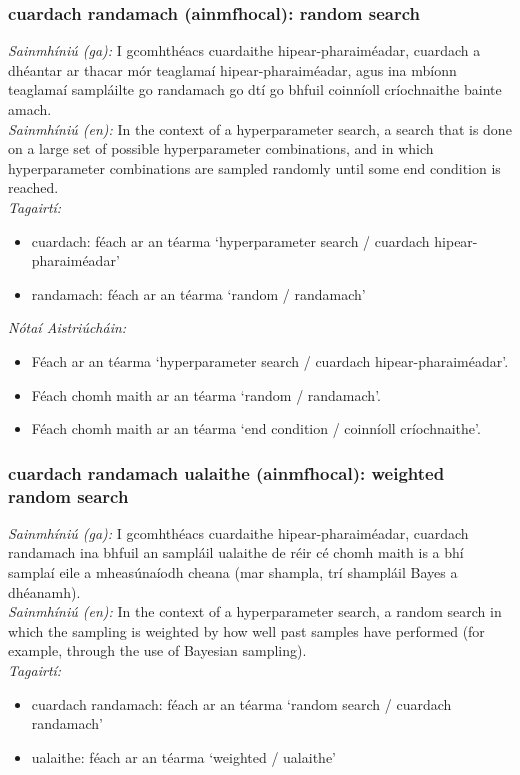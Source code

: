 \documentclass{article}
\begin{document}
\subsubsection*{cuardach randamach (ainmfhocal): random search}
 \noindent \textit{Sainmhíniú (ga):} I gcomhthéacs cuardaithe hipear-pharaiméadar, cuardach a dhéantar ar thacar mór teaglamaí hipear-pharaiméadar, agus ina mbíonn teaglamaí sampláilte go randamach go dtí go bhfuil coinníoll críochnaithe bainte amach.
\\
 \noindent \textit{Sainmhíniú (en):} In the context of a hyperparameter search, a search that is done on a large set of possible hyperparameter combinations, and in which hyperparameter combinations are sampled randomly until some end condition is reached.
\\
 \noindent \textit{Tagairtí:}
\begin{itemize}
	\item cuardach: féach ar an téarma `hyperparameter search / cuardach hipear-pharaiméadar'
	\item randamach: féach ar an téarma `random / randamach'
\end{itemize}

 \noindent \textit{Nótaí Aistriúcháin:}
\begin{itemize}
	\item Féach ar an téarma `hyperparameter search / cuardach hipear-pharaiméadar'.
	\item Féach chomh maith ar an téarma `random / randamach'.
	\item Féach chomh maith ar an téarma `end condition / coinníoll críochnaithe'.
\end{itemize}


\subsubsection*{cuardach randamach ualaithe (ainmfhocal): weighted random search}
 \noindent \textit{Sainmhíniú (ga):} I gcomhthéacs cuardaithe hipear-pharaiméadar, cuardach randamach ina bhfuil an sampláil ualaithe de réir cé chomh maith is a bhí samplaí eile a mheasúnaíodh cheana (mar shampla, trí shampláil Bayes a dhéanamh).
\\
 \noindent \textit{Sainmhíniú (en):} In the context of a hyperparameter search, a random search in which the sampling is weighted by how well past samples have performed (for example, through the use of Bayesian sampling).
\\
 \noindent \textit{Tagairtí:}
\begin{itemize}
	\item cuardach randamach: féach ar an téarma `random search / cuardach randamach'
	\item ualaithe: féach ar an téarma `weighted / ualaithe'
\end{itemize}
\end{document}

